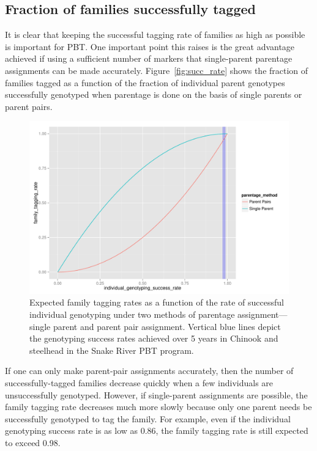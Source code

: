 \documentclass[11pt]{article}
\begin{document}
\subsection{Fraction of families successfully tagged}
It is clear that keeping the successful tagging rate of families as high as possible is important for PBT.  One important
point this raises is the great advantage achieved if using a sufficient number of markers that single-parent
parentage assignments can be made accurately.  Figure~\ref{fig:succ_rate} shows the fraction of families tagged as a 
function of the fraction of individual parent genotypes successfully genotyped when parentage is done on the basis
of single parents or parent pairs.  
\begin{figure}
\centering
\includegraphics[width = \textwidth]{images/succ_rate.pdf}
\caption{Expected family tagging rates as a function of the rate of successful individual genotyping
under two methods of parentage assignment---single parent and parent pair assignment.  Vertical blue lines
depict the genotyping success rates achieved over 5 years in Chinook and steelhead in the Snake River
PBT program.  }
\end{figure}

If one can only make parent-pair assignments accurately, then the number of successfully-tagged
families decrease quickly when a few individuals are unsuccessfully genotyped.  However, if single-parent assignments
are possible, the family tagging rate decreases much more  slowly because only one parent needs be successfully genotyped
to tag the family.  For example, even if the individual genotyping success rate is as low as 0.86, the family tagging rate
is still expected to exceed 0.98.  
\end{document}
